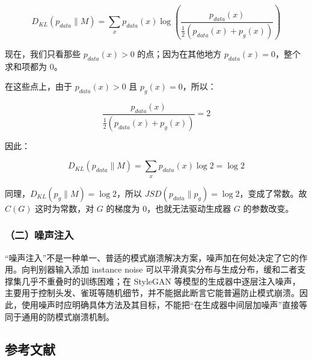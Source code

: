 \[
D_{KL}(p_{data}\parallel M)=\sum_x p_{data}(x)\log\left(\frac{p_{data}(x)}{\frac{1}{2}(p_{data}(x)+p_g(x))}\right)
\]

现在，我们只看那些 \(p_{data}(x)>0\) 的点；因为在其他地方 \(p_{data}(x)=0\)，整个求和项都为 0。

在这些点上，由于 \(p_{data}(x)>0\) 且 \(p_g(x)=0\)，所以：

\[
\frac{p_{data}(x)}{\frac{1}{2}(p_{data}(x)+p_g(x))}=2
\]

因此：

\[
D_{KL}(p_{data}\parallel M)=\sum_x p_{data}(x)\log 2=\log 2
\]

同理，\(D_{KL}(p_g\parallel M)=\log 2\)，所以 \(JSD(p_{data}\parallel p_g)=\log 2\)，变成了常数。故 \(C(G)\) 这时为常数，对 \(G\) 的梯度为 0，也就无法驱动生成器 \(G\) 的参数改变。

\hypertarget{ux4e8cux566aux58f0ux6ce8ux5165}{%
\subsubsection{（二）噪声注入}\label{ux4e8cux566aux58f0ux6ce8ux5165}}

``噪声注入''不是一种单一、普适的模式崩溃解决方案，噪声加在何处决定了它的作用。向判别器输入添加 instance noise 可以平滑真实分布与生成分布，缓和二者支撑集几乎不重叠时的训练困难；在 StyleGAN 等模型的生成器中逐层注入噪声，主要用于控制头发、雀斑等随机细节，并不能据此断言它能普遍防止模式崩溃。因此，使用噪声时应明确具体方法及其目标，不能把``在生成器中间层加噪声''直接等同于通用的防模式崩溃机制。

\FloatBarrier
{}
\hypertarget{ux53c2ux8003ux6587ux732e-39}{%
\subsection{参考文献}\label{ux53c2ux8003ux6587ux732e-39}}

